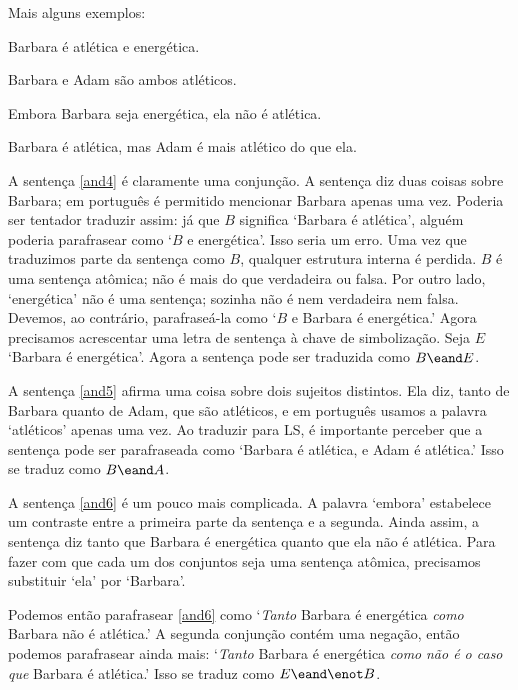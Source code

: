 Mais alguns exemplos:
\begin{earg}
\item[\ex{and4}] Barbara é atlética e energética.
\item[\ex{and5}] Barbara e Adam são ambos atléticos.
\item[\ex{and6}] Embora Barbara seja energética, ela não é atlética.
\item[\ex{and7}] Barbara é atlética, mas Adam é mais atlético do que ela.
\end{earg}

A sentença \ref{and4} é claramente uma conjunção. A sentença diz duas coisas sobre Barbara; em português é permitido mencionar Barbara apenas uma vez. Poderia ser tentador traduzir assim: já que $B$ significa `Barbara é atlética', alguém poderia parafrasear como `$B$ e energética'. Isso seria um erro. Uma vez que traduzimos parte da sentença como $B$, qualquer estrutura interna é perdida. $B$ é uma sentença atômica; não é mais do que verdadeira ou falsa. Por outro lado, `energética' não é uma sentença; sozinha não é nem verdadeira nem falsa. Devemos, ao contrário, parafraseá-la como `$B$ e Barbara é energética.' Agora precisamos acrescentar uma letra de sentença à chave de simbolização. Seja $E$ `Barbara é energética'. Agora a sentença pode ser traduzida como $B\eand E$.


A sentença \ref{and5} afirma uma coisa sobre dois sujeitos distintos. Ela diz, tanto de Barbara quanto de Adam, que são atléticos, e em português usamos a palavra `atléticos' apenas uma vez. Ao traduzir para LS, é importante perceber que a sentença pode ser parafraseada como `Barbara é atlética, e Adam é atlética.' Isso se traduz como $B\eand A$.

A sentença \ref{and6} é um pouco mais complicada. A palavra `embora' estabelece um contraste entre a primeira parte da sentença e a segunda. Ainda assim, a sentença diz tanto que Barbara é energética quanto que ela não é atlética. Para fazer com que cada um dos conjuntos seja uma sentença atômica, precisamos substituir `ela' por `Barbara'.

Podemos então parafrasear \ref{and6} como `\emph{Tanto} Barbara é energética \emph{como} Barbara não é atlética.' A segunda conjunção contém uma negação, então podemos parafrasear ainda mais: `\emph{Tanto} Barbara é energética \emph{como} \emph{não é o caso que} Barbara é atlética.' Isso se traduz como $E\eand\enot B$.

